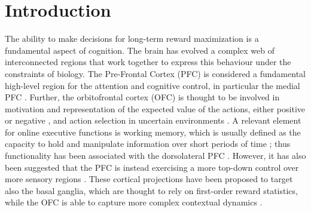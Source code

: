 
\section{Introduction}
\hfill \break
\vspace {0.5cm}

The ability to make decisions for long-term reward maximization is a fundamental aspect of cognition. The brain has evolved a complex web of interconnected regions that work together to express this behaviour under the constraints of biology. The Pre-Frontal Cortex (PFC) is considered
a fundamental high-level region for the attention and cognitive control, in particular the medial PFC \cite{millerIntegrativeTheoryPrefrontal2001a, sheynikhovichLongtermMemorySynaptic2023}.
Further, the orbitofrontal cortex (OFC) is thought to be involved in motivation and representation of the expected value of the actions, either positive or negative  \cite{odohertyAbstractRewardPunishment2001, ricebergRewardStabilityDetermines2012, tremblayRelativeRewardPreference1999}, and action
selection in uncertain environments \cite{elliottDissociableFunctionsMedial2000}.
A relevant element for online executive functions is working memory, which is usually defined as the capacity to hold and manipulate information over short periods of time \cite{baddeleyWorkingMemory1974}; thus functionality 
has been associated with the dorsolateral PFC \cite{dardenneRolePrefrontalCortex2012, cohenTemporalDynamicsBrain1997, constantinidisPersistentSpikingActivity2018, zylberbergMechanismsPersistentActivity2017}.
However, it has also been suggested that the PFC is instead exercising a more top-down control over more sensory regions \cite{laraRolePrefrontalCortex2015}. These cortical projections have been proposed to target also the basal ganglia, which are thought to rely on first-order reward statistics,
while the OFC is able to capture more complex contextual dynamics \cite{frankAnatomyDecisionStriatoorbitofrontal2006}.

